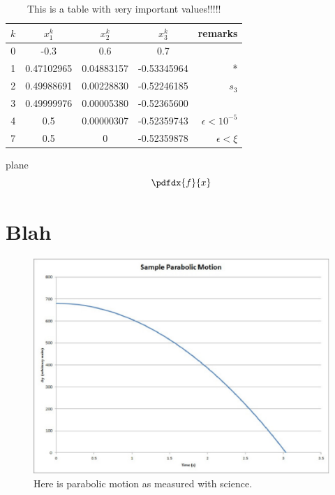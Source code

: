 \begin{table}
\centering
\begin{tabular}{|c|ccc|r|}
	\hline
$k$ &  $x_1^k$    &   $x_2^k$  & $x_3^k$   & remarks  \\
	\hline
0   & -0.3 & 0.6 & 0.7  &  \\
1   & 0.47102965 & 0.04883157 & -0.53345964  & *\\
2   & 0.49988691 & 0.00228830 & -0.52246185 & $s_3$ \\
3   & 0.49999976 & 0.00005380 & -0.52365600  & \\
4   & 0.5 & 0.00000307 & -0.52359743  & $\epsilon < 10^{-5}$ \\
7   & 0.5 & 0 & -0.52359878  & $\epsilon < \xi $ \\
	\hline
\end{tabular}
\caption[A table of important values]{This is a table with {\emph very} important values!!!!!}
\label{important_values}
\end{table}
    
\uv plane
    $$ \pdfdx{f}{x} $$

\section{Blah} 
\lipsum
\begin{figure}
\centering
\includegraphics{parabolic_motion}
\caption[Parabolic Motion]{Here is parabolic motion as measured with science.}
\label{parabolic_motion}
\end{figure}
\lipsum
